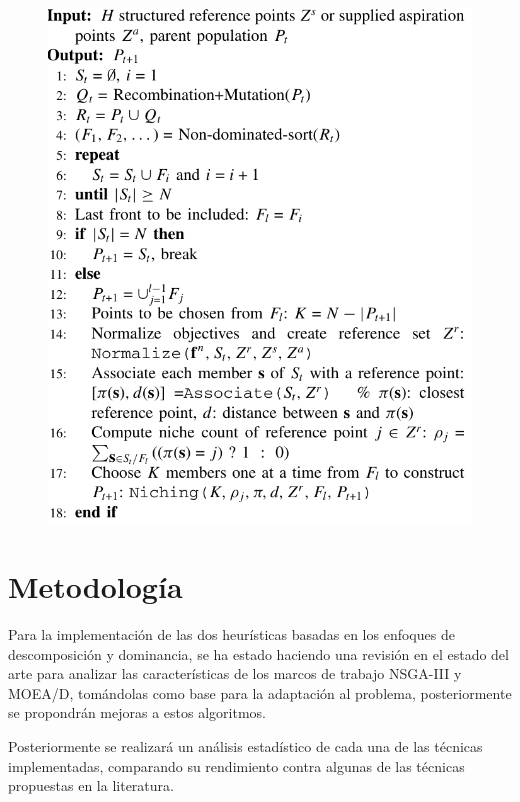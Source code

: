 \documentclass[letterpaper,10pt]{article}
\begin{document}
\begin{figure}[h]
 \centering
\includegraphics[scale=0.35]{nsgaiiiP.png}
\end{figure}

\section{Metodología}

Para la implementación de las dos heurísticas basadas en los enfoques de descomposición y dominancia, se ha estado haciendo una revisión en el estado del arte para analizar las características de los marcos de trabajo NSGA-III y MOEA/D, tomándolas  como  base para la adaptación al problema, posteriormente se propondrán mejoras a estos algoritmos.
 
Posteriormente se realizará un análisis estadístico de cada una de las técnicas implementadas, comparando su rendimiento contra algunas de las  técnicas propuestas en la literatura.
 
\end{document}
